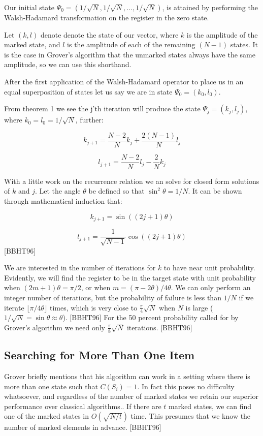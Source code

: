 \documentclass[]{article}
\begin{document}
Our initial state $\Psi_{0} = (1/\sqrt{N}, 1/\sqrt{N}, \ldots,
1/\sqrt{N})$, is attained by performing the Walsh-Hadamard
transformation on the register in the zero state.

Let $(k,l)$ denote denote the state of our vector, where $k$ is the
amplitude of the marked state, and $l$ is the amplitude of each of the
remaining $(N-1)$ states.  It is the case in Grover's algorithm that
the unmarked states always have the same amplitude, so we can use this
shorthand.

After the first application of the Walsh-Hadamard operator to place us
in an equal superposition of states let us say we are in state
$\Psi_{0} = (k_{0}, l_{0})$.

From theorem 1 we see the j'th iteration will produce the state
$\Psi_{j} = (k_{j}, l_{j})$, where $k_{0} = l_{0} = 1/\sqrt{N}$,
further:

	\[k_{j+1} = \frac{N-2}{N}k_{j} + \frac{2(N-1)}{N}l_{j}\] 

	\[l_{j+1} = \frac{N-2}{N}l_{j} - \frac{2}{N}k_{j}\]

With a little work on the recurrence relation we an solve for closed
form solutions of $k$ and $j$.  Let the angle $\theta$ be defined so
that $\sin^{2}{\theta} = 1/N$.  It can be shown through mathematical
induction that:

	\[k_{j+1} = \sin{((2j+1)\theta)}\] 

	\[l_{j+1} = \frac{1}{\sqrt{N-1}}\cos((2j+1)\theta)\]
	[BBHT96]

We are interested in the number of iterations for $k$ to have near
unit probability.  Evidently, we will find the register to be in the
target state with unit probability when $(2m + 1)\theta = \pi/2$, or
when $m = (\pi-2\theta)/4\theta$.  We can only perform an integer
number of iterations, but the probability of failure is less than
$1/N$ if we iterate $\lfloor \pi / 4 \theta \rfloor$ times, which is
very close to $\frac{\pi}{4}\sqrt{N}$ when $N$ is large ($1/\sqrt{N} =
\sin{\theta} \approx \theta$).  [BBHT96] For the 50 percent
probability called for by Grover's algorithm we need only
$\frac{\pi}{8}\sqrt{N}$ iterations. [BBHT96]

\subsection{Searching for More Than One Item}

Grover briefly mentions that his algorithm can work in a setting where
there is more than one state such that $C(S_{i}) = 1$.  In fact this
poses no difficulty whatsoever, and regardless of the number of marked
states we retain our superior performance over classical algorithms..
If there are $t$ marked states, we can find one of the marked states
in $O(\sqrt{N/t})$ time.  This presumes that we know the number of
marked elements in advance. [BBHT96]
\end{document}
